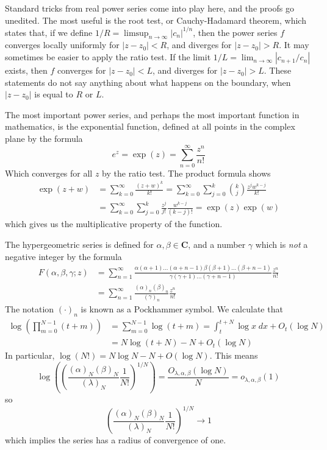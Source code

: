 Standard tricks from real power series come into play here, and the proofs go unedited. The most useful is the root test, or Cauchy-Hadamard theorem, which states that, if we define $1/R = \limsup_{n \to \infty} |c_n|^{1/n}$, then the power series $f$ converges locally uniformly for $|z - z_0| < R$, and diverges for $|z - z_0| > R$. It may sometimes be easier to apply the ratio test. If the limit $1/L = \lim_{n \to \infty} | c_{n+1}/c_n|$ exists, then $f$ converges for $|z - z_0| < L$, and diverges for $|z - z_0| > L$. These statements do not say anything about what happens on the boundary, when $|z - z_0|$ is equal to $R$ or $L$.

\begin{example}
    The most important power series, and perhaps the most important function in mathematics, is the exponential function, defined at all points in the complex plane by the formula
    \[ e^z = \exp(z) = \sum_{n = 0}^\infty \frac{z^n}{n!} \]
    Which converges for all $z$ by the ratio test. The product formula shows
    \begin{align*}
    \exp(z + w) &= \sum_{k = 0}^\infty \frac{(z + w)^k}{k!} = \sum_{k = 0}^\infty \sum_{j = 0}^k \binom{k}{j} \frac{z^j w^{k-j}}{k!}\\
    &= \sum_{k = 0}^\infty \sum_{j = 0}^k \frac{z^j}{j!} \frac{w^{k-j}}{(k - j)!} = \exp(z) \exp(w)
    \end{align*}
    which gives us the multiplicative property of the function.
\end{example}

\begin{example}
    The hypergeometric series is defined for $\alpha, \beta \in \mathbf{C}$, and a number $\gamma$ which is {\it not} a negative integer by the formula
    \begin{align*}
        F(\alpha,\beta,\gamma;z) &= \sum_{n = 1}^\infty \frac{\alpha(\alpha+1)\dots(\alpha + n - 1) \beta(\beta + 1) \dots (\beta + n - 1)}{\gamma (\gamma + 1) \dots (\gamma + n - 1)} \frac{z^n}{n!}\\
        &= \sum_{n = 1}^\infty \frac{(\alpha)_n (\beta)_n}{(\gamma)_n} \frac{z^n}{n!}
    \end{align*}
    The notation $(\cdot)_n$ is known as a Pockhammer symbol. We calculate that
    \begin{align*}
        \log \left( \prod_{m = 0}^{N-1} (t + m) \right) &= \sum_{m = 0}^{N-1} \log(t + m) = \int_t^{t + N} \log x\; dx + O_t(\log N)\\
        &= N \log(t + N) - N + O_t(\log N)
    \end{align*}
    In particular, $\log(N!) = N \log N - N + O(\log N)$. This means
    \[ \log \left( \left( \frac{(\alpha)_N (\beta)_N}{(\lambda)_N} \frac{1}{N!} \right)^{1/N} \right) = \frac{O_{\lambda, \alpha,\beta}(\log N)}{N} = o_{\lambda, \alpha, \beta}(1) \]
    so
    \[ \left( \frac{(\alpha)_N (\beta)_N}{(\lambda)_N} \frac{1}{N!} \right)^{1/N} \to 1 \]
    which implies the series has a radius of convergence of one.
\end{example}

